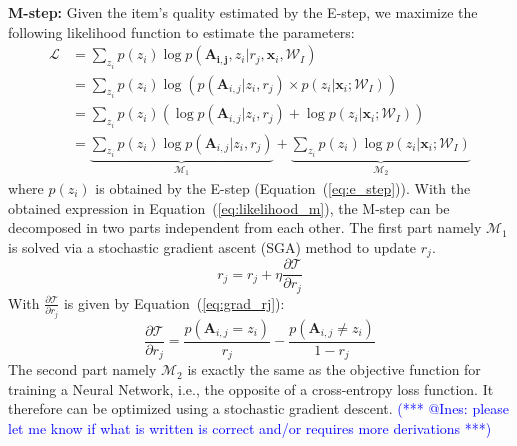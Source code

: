 \documentclass{article}
\makeatletter
\newcommand{\iar}[1]{\textcolor{blue}{(*** @Ines: #1 ***)}}
\makeatother
\begin{document}
\noindent\textbf{M-step:}
Given the item's quality estimated by the E-step, we maximize
the following likelihood function to estimate the parameters:
\begin{align}
   \mathcal{L}
    &=\sum_{z_i}p(z_i)\log p(\mathbf{A_{i,j}},z_i|r_j,\mathbf{x}_i,\mathcal{W}_I)\nonumber\\
    &=\sum_{z_i}p(z_i)\log (p(\mathbf{A}_{i,j}| z_i , r_j) \times p(z_i |\mathbf{x}_i;\mathcal{W}_I)) \nonumber\\
    &=\sum_{z_i}p(z_i) (\log p(\mathbf{A}_{i,j}| z_i , r_j)+\log p(z_i |\mathbf{x}_i;\mathcal{W}_I)) \nonumber\\
    &=\underbrace{\sum_{z_i}p(z_i) \log p(\mathbf{A}_{i,j}| z_i , r_j)}_{\mathcal{M}_1}
    +\underbrace{\sum_{z_i}p(z_i)\log p(z_i |\mathbf{x}_i;\mathcal{W}_I)}_{\mathcal{M}_2}
    \label{eq:likelihood_m}
\end{align}
where $p(z_i)$ is obtained by the E-step (Equation~(\ref{eq:e_step})). With the obtained expression in 
Equation~(\ref{eq:likelihood_m}), the M-step can be decomposed in two parts independent from each other.
The first part namely $\mathcal{M}_1$ is solved via a stochastic gradient
ascent (SGA) method to update $r_j$.
\begin{equation}
    r_j=r_j+\eta \frac{\partial \mathcal{T}}{\partial r_j}
    \label{eq:m_rj}
\end{equation}
With $\frac{\partial \mathcal{T}}{\partial r_j}$ is given by Equation~(\ref{eq:grad_rj}):
\begin{equation}
    \frac{\partial \mathcal{T}}{\partial r_j}=\frac{p(\mathbf{A}_{i,j}=z_i)}{r_j}-\frac{p(\mathbf{A}_{i,j}\neq z_i)}{1-r_j}
    \label{eq:grad_rj}
\end{equation}
The second part namely $\mathcal{M}_2$  is exactly the same as the objective function for 
training a Neural Network, i.e., the opposite of a cross-entropy loss function. 
It therefore can be optimized using a stochastic gradient descent.
\iar{please let me know if what is written is correct and/or requires more derivations}
\end{document}
